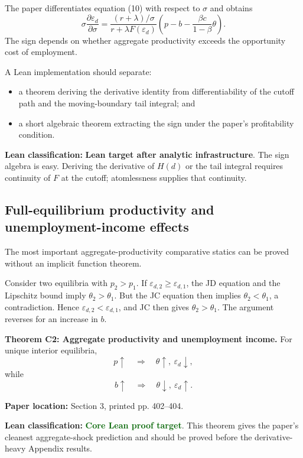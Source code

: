 \documentclass[11pt]{article}
\newcommand{\epsd}{\varepsilon_d}
\newcommand{\paperloc}[1]{\textbf{Paper location:} #1}
\newcommand{\leanclass}[1]{\textbf{Lean classification:} #1}
\newcommand{\core}{\textcolor{darkGreen}{\textbf{Core Lean proof target}}}
\newcommand{\infra}{\textcolor{darkAmber}{\textbf{Lean target after analytic infrastructure}}}
\newcommand{\resultname}[1]{\medskip\noindent\textbf{#1.}}
\begin{document}
The paper differentiates equation (10) with respect to $\sigma$ and obtains
\begin{equation}
 \sigma\frac{\partial\epsd}{\partial\sigma}
 =\frac{(r+\lambda)/\sigma}{r+\lambda F(\epsd)}
 \left(p-b-\frac{\beta c}{1-\beta}\theta\right). \tag{11}
\end{equation}
The sign depends on whether aggregate productivity exceeds the opportunity cost of employment.

A Lean implementation should separate:
\begin{itemize}
\item a theorem deriving the derivative identity from differentiability of the cutoff path and the moving-boundary tail integral; and
\item a short algebraic theorem extracting the sign under the paper's profitability condition.
\end{itemize}

\leanclass{\infra.}
The sign algebra is easy. Deriving the derivative of $H(d)$ or the tail integral requires continuity of $F$ at the cutoff; atomlessness supplies that continuity.

\subsection{Full-equilibrium productivity and unemployment-income effects}

The most important aggregate-productivity comparative statics can be proved without an implicit function theorem.

Consider two equilibria with $p_2>p_1$. If $\varepsilon_{d,2}\ge\varepsilon_{d,1}$, the JD equation and the Lipschitz bound imply $\theta_2>\theta_1$. But the JC equation then implies $\theta_2<\theta_1$, a contradiction. Hence $\varepsilon_{d,2}<\varepsilon_{d,1}$, and JC then gives $\theta_2>\theta_1$. The argument reverses for an increase in $b$.

\resultname{Theorem C2: Aggregate productivity and unemployment income}
For unique interior equilibria,
\[
 p\uparrow\quad\Longrightarrow\quad \theta\uparrow,\ \epsd\downarrow,
\]
while
\[
 b\uparrow\quad\Longrightarrow\quad \theta\downarrow,\ \epsd\uparrow.
\]

\paperloc{Section 3, printed pp. 402--404.}

\leanclass{\core.}
This theorem gives the paper's cleanest aggregate-shock prediction and should be proved before the derivative-heavy Appendix results.
\end{document}
